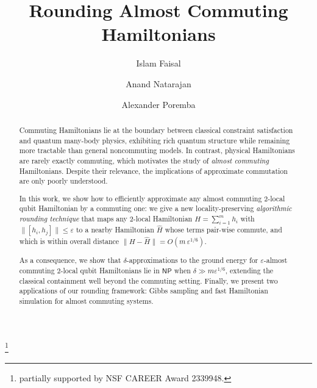 \documentclass[a4paper,onecolumn,11pt]{quantumarticle}
\theoremstyle{plain}
\newcommand{\eps}{\varepsilon}
\begin{document}
\title{Rounding Almost Commuting Hamiltonians}

\author{Islam Faisal}
\author{Anand Natarajan}
\thanks{partially supported by NSF CAREER Award 2339948.}
\author{Alexander Poremba}
\maketitle

\begin{abstract}
Commuting Hamiltonians lie at the boundary between classical constraint satisfaction and quantum many-body physics, exhibiting rich quantum structure while remaining more tractable than general noncommuting models.  In contrast, physical Hamiltonians are rarely exactly commuting,
which motivates the study of \emph{almost commuting} Hamiltonians. Despite their relevance, the implications of approximate commutation are only poorly understood.

In this work, we show how to efficiently approximate any almost commuting $2$-local qubit Hamiltonian by a commuting one: we give a new locality-preserving \emph{algorithmic rounding technique} that maps any $2$-local Hamiltonian $H=\sum_{i=1}^m h_i$ with $\|[h_i,h_j]\| \leq \eps$ to a nearby Hamiltonian
$\hat{H}$ whose terms pair-wise commute, and which is within overall distance
$\|H-\hat{H}\| = O(m\,\eps^{1/6})$.  

As a consequence, we show that $\delta$-approximations to the ground energy for
$\eps$-almost commuting $2$-local qubit Hamiltonians
lie in $\mathsf{NP}$ when $\delta \gg m\eps^{1/6}$, extending the classical containment well
beyond the commuting setting.   Finally, we present two applications of our rounding framework: Gibbs sampling and fast Hamiltonian simulation for almost commuting systems.
\end{abstract}
\end{document}
